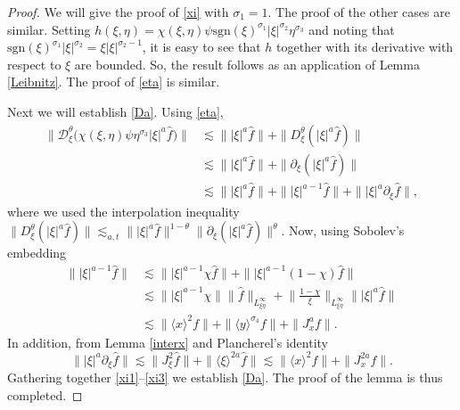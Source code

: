 \documentclass[reqno]{amsart}
\newcommand{\les}{\lesssim}
\newcommand{\lan}{\langle \xi \rangle}
\newcommand{\lanx}{\langle x \rangle}
\newcommand{\lany}{\langle y \rangle}
\newcommand{\Dt}{\mathcal{D}^{\theta}_\xi}
\newcommand{\p}{\partial}
\newcommand{\sgn}{\text{sgn}}
\numberwithin{equation}{section}
\begin{document}
\begin{proof}
We will give the proof of \eqref{xi} with $\sigma_1=1$. The proof of  the other cases are similar. Setting $h(\xi,\eta)=\chi(\xi,\eta)\psi \sgn(\xi)^{\sigma_1}|\xi|^{\sigma_2}\eta^{\sigma_3}$ and noting that $\sgn(\xi)^{\sigma_1}|\xi|^{\sigma_2}=\xi|\xi|^{\sigma_2-1}$, it is easy to see that $h$ together with its derivative with respect to $\xi$ are bounded. So, the result follows as an application of Lemma \ref{Leibnitz}. The proof of \eqref{eta} is similar.

Next we will establish \eqref{Da}. Using \eqref{eta},
\begin{equation}
\begin{split}\label{xi1}
\|\Dt\big(\chi(\xi,\eta)\psi \eta^{\sigma_3} |\xi|^a \hat{f}\big)\|&\lesssim \||\xi|^a \hat f\|+\|D_\xi^\theta(|\xi|^a \hat f)\|\\
&\les \||\xi|^a \hat f\|+\|\p_\xi(|\xi|^a \hat f)\|\\
&\les \||\xi|^a \hat f\|+\||\xi|^{a-1} \hat f\|+\||\xi|^a \p_\xi \hat f\|,
\end{split}
\end{equation}
where  we used the interpolation inequality
$
\|D_\xi^\theta(|\xi|^a \hat f)\|\les_{a,t} \||\xi|^a \hat f\|^{1-\theta}\|\p_\xi(|\xi|^a \hat f)\|^\theta.
$
Now, using Sobolev's embedding 
\begin{equation}
\begin{split}\label{xi2}
\||\xi|^{a-1} \hat f\|&\les \||\xi|^{a-1}\chi \hat f\|+\||\xi|^{a-1}(1-\chi)\hat f\|\\
&\les \||\xi|^{a-1}\chi\|\|\hat f\|_{L^\infty_{\xi\eta}}+\Big\|\frac{1-\chi}{\xi} \Big\|_{L^\infty_{\xi\eta}}\||\xi|^a \hat f\|\\
&\les \|\lanx^2 f\|+\|\lany^{\sigma_4} f\|+\|J_x^{a}f\|.
\end{split}
\end{equation}
In addition, from Lemma \ref{interx} and Plancherel's identity
\begin{equation}\label{xi3}
\||\xi|^a \p_\xi \hat f\|\les \|J_\xi^2 \hat f\|+\|\lan^{2a}\hat f\|\les \|\lanx^2 f\|+\|J_x^{2a}f\|.
\end{equation}
Gathering together \eqref{xi1}--\eqref{xi3} we establish \eqref{Da}.
The proof of the lemma is thus completed.
\end{proof}
\end{document}
